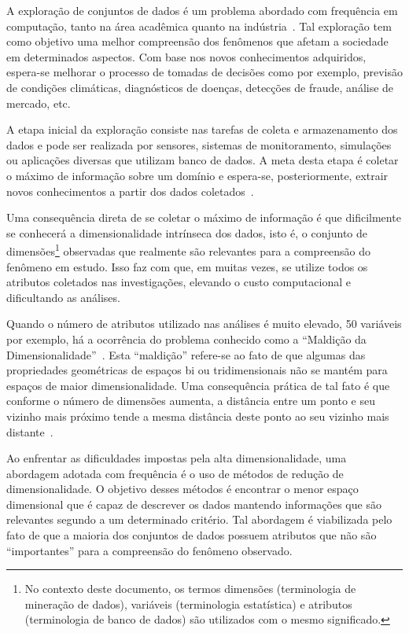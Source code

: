 A exploração de conjuntos de dados é um problema abordado com frequência em computação, tanto na área acadêmica quanto na indústria~\cite{Ngai2009,Harding2006}. Tal exploração tem como objetivo uma melhor compreensão dos fenômenos que afetam a sociedade em determinados aspectos. Com base nos novos conhecimentos adquiridos, espera-se melhorar o processo de tomadas de decisões como por exemplo, previsão de condições climáticas, diagnósticos de doenças, detecções de fraude, análise de mercado, etc.

A etapa inicial da exploração consiste nas tarefas de coleta e armazenamento dos dados e pode ser realizada por sensores, sistemas de monitoramento, simulações ou aplicações diversas que utilizam banco de dados. A meta desta etapa é coletar o máximo de informação sobre um domínio e espera-se, posteriormente, extrair novos conhecimentos a partir dos dados coletados~\cite{Keim2002}. 

Uma consequência direta de se coletar o máximo de informação é que dificilmente se conhecerá a dimensionalidade intrínseca dos dados, isto é, o conjunto de dimensões\footnote{No contexto deste documento, os termos dimensões (terminologia de mineração de dados), variáveis (terminologia estatística) e atributos (terminologia de banco de dados) são utilizados com o mesmo significado.} observadas que realmente são relevantes para a compreensão do fenômeno em estudo. Isso faz com que, em muitas vezes, se utilize todos os atributos coletados nas investigações, elevando o custo computacional e dificultando as análises. 

Quando o número de atributos utilizado nas análises é muito elevado, 50 variáveis por exemplo, há a ocorrência do problema conhecido como a  ``Maldição da Dimensionalidade''~\cite{Beyer1999}. Esta ``maldição'' refere-se ao fato de que algumas das propriedades geométricas de espaços bi ou tridimensionais não se mantém para espaços de maior dimensionalidade. Uma consequência prática de tal fato é que conforme o número de  dimensões aumenta, a distância entre um ponto e seu vizinho mais próximo tende a mesma distância deste ponto ao seu vizinho mais distante~\citet{Beyer1999}.

Ao enfrentar as dificuldades impostas pela alta dimensionalidade, uma abordagem adotada com frequência é o uso de métodos de redução de dimensionalidade. O objetivo desses métodos é encontrar o menor espaço dimensional que é capaz de descrever os dados mantendo informações que são relevantes segundo a um determinado critério. Tal abordagem é  viabilizada pelo fato de que a maioria dos conjuntos de dados possuem atributos que não são ``importantes'' para a compreensão do fenômeno observado.


